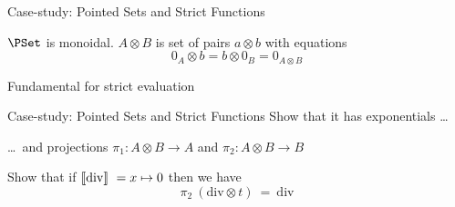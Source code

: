 \documentclass{beamer}
\begin{document}
\begin{frame}{Case-study: Pointed Sets and Strict Functions}

        $\PSet$ is monoidal. $A \otimes B$ is set of pairs $a \otimes b$ with
        equations
        \[
                0_A \otimes b = b \otimes 0_B = 0_{A \otimes B}
        \]


        \medskip
        Fundamental for strict evaluation
\end{frame}

\begin{frame}{Case-study: Pointed Sets and Strict Functions}
        Show that it has exponentials \dots

        \dots\ and projections $\pi_1 : A \otimes B \to A$ and $\pi_2 : A
        \otimes B \to B$


        \bigskip
        \pause
        Show that if $\llbracket \mathrm{div} \rrbracket\ = x \mapsto 0$ then we have
        \[
                \pi_2\ (\mathrm{div} \otimes t)\ =\ \mathrm{div}
        \]
\end{frame}
\end{document}
